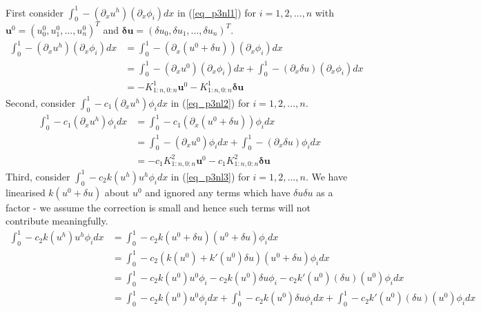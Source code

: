 \documentclass[11pt,fleqn]{article}
\theoremstyle{defstyle}
\begin{document}
First consider $\int_0^1 -(\partial_xu^h)(\partial_x\phi_i)dx$  in (\ref{eq_p3nl1}) for $i=1,2,...,n$ with $\mathbf{u}^0 = \left(u^0_0,u^0_1,...,u^0_n\right)^T$ and $\mathbf{\delta u} = \left(\delta u_0,\delta u_1,...,\delta u_n\right)^T$.
\begin{equation}
\begin{aligned}
\int_0^1 -(\partial_xu^h)(\partial_x\phi_i)dx &= \int_0^1 -(\partial_x(u^0 + \delta u))(\partial_x\phi_i)dx \\
&=\int_0^1 -(\partial_xu^0)(\partial_x\phi_i)dx + \int_0^1 -(\partial_x\delta u)(\partial_x\phi_i)dx \\
& = -K^1_{1:n,0:n}\mathbf{u}^0 - K^1_{1:n,0:n}\mathbf{\delta u}
\end{aligned}
\label{eq_p3nl1}
\end{equation}
Second, consider $\int_0^1 -c_1(\partial_xu^h)\phi_idx$ in (\ref{eq_p3nl2}) for $i=1,2,...,n$.
\begin{equation}
\begin{aligned}
\int_0^1 -c_1(\partial_xu^h)\phi_idx &= \int_0^1 -c_1(\partial_x(u^0 + \delta u))\phi_idx \\
&=\int_0^1 -(\partial_xu^0)\phi_idx + \int_0^1 -(\partial_x\delta u)\phi_idx \\
& = -c_1K^2_{1:n,0:n}\mathbf{u}^0 - c_1K^2_{1:n,0:n}\mathbf{\delta u}
\end{aligned}
\label{eq_p3nl2}
\end{equation}
Third, consider $\int_0^1  -c_2k(u^h)u^h\phi_idx$ in (\ref{eq_p3nl3}) for $i=1,2,...,n$. We have linearised $k(u^0 + \delta u)$ about $u^0$ and ignored any terms which have $\delta u \delta u$ as a factor - we assume the correction is small and hence such terms will not contribute meaningfully.
\begin{equation}
\begin{aligned}
\int_0^1  -c_2k(u^h)u^h\phi_idx &= \int_0^1  -c_2k(u^0 + \delta u)(u^0 + \delta u)\phi_idx \\
& = \int_0^1  -c_2\left(k(u^0) + k\prime(u^0)\delta u\right)(u^0 + \delta u)\phi_idx \\
&= \int_0^1  -c_2k(u^0)u^0\phi_i -c_2k(u^0)\delta u\phi_i -c_2 k\prime(u^0)(\delta u )(u^0) \phi_i dx \\
&= \int_0^1  -c_2k(u^0)u^0\phi_i dx + \int_0^1 -c_2k(u^0)\delta u\phi_idx + \int_0^1 -c_2 k\prime(u^0)(\delta u )(u^0) \phi_i dx \\
\end{aligned}
\label{eq_p3nl3}
\end{equation}
\end{document}
